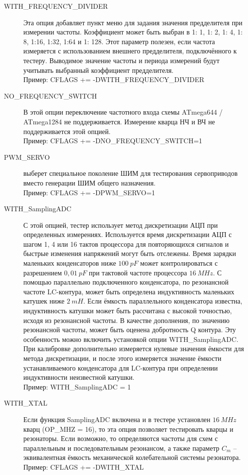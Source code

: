 \begin{description}
  \item[WITH\_FREQUENCY\_DIVIDER]
Эта опция добавляет пункт меню для задания значения предделителя при измерении частоты.
Коэффициент может быть выбран в 1: 1, 1: 2, 1: 4, 1: 8, 1:16, 1:32, 1:64 и 1: 128.
Этот параметр полезен, если частота измеряется с использованием внешнего предделителя, подключённого к тестеру.
Выводимое значение частоты и периода измерений будут учитывать выбранный коэффициент предделителя.\\
Пример: CFLAGS += -DWITH\_FREQUENCY\_DIVIDER

 \item[NO\_FREQUENCY\_SWITCH]
В этой опции переключение частотного входа схемы ATmega644 / ATmega1284 не поддерживается.
Измерение кварца НЧ и ВЧ не поддерживается этой опцией.\\
Пример: CFLAGS += -DNO\_FREQUENCY\_SWITCH=1

 \item[PWM\_SERVO] 
выберет специальное поколение ШИМ для тестирования сервоприводов вместо генерации ШИМ общего назначения.\\ 
Пример: CFLAGS += -DPWM\_SERVO=1

  \item[WITH\_SamplingADC] С этой опцией, тестер использует метод дискретизации АЦП при определенных измерениях.
Используется время дискретизации АЦП с шагом 1, 4 или 16 тактов процессора для повторяющихся сигналов и
быстрые изменения напряжений могут быть отслежены.
Время зарядки маленьких конденсаторов ниже \(100~pF\) может контролироваться с разрешением \(0,01~pF\) при 
тактовой частоте процессора \(16~MHz\).
С помощью параллельно подключенного конденсатора, по резонансной частоте LC-контура, может быть
определена индуктивность маленьких катушек ниже \(2~mH\).
Если ёмкость параллельного конденсатора известна, индуктивность катушки может быть рассчитана с высокой
точностью, исходя из резонансной частоты. В качестве дополнения, по значению резонансной частоты, может
быть оценена добротность Q контура.
Эту особенность можно включить установкой опции WITH\_SamplingADC.
При калибровке дополнительно измеряется нулевые значения ёмкости для метода дискретизации, и после этого измеряется
значение ёмкости устанавливаемого конденсатора для LC-контура при определении индуктивности неизвестной катушки.\\
Пример: WITH\_SamplingADC = 1

  \item[WITH\_XTAL] Если функция SamplingADC включена и в тестере установлен \(16~MHz\) кварц (OP\_MHZ = 16),
то эта опция позволяет тестировать кварцы и резонаторы.
Если возможно, то определяются частоты для схем с параллельным и последовательным резонансом,
а также параметр $C_{m}$ -- эквивалентная ёмкость механической колебательной системы резонатора.\\
Пример: CFLAGS += -DWITH\_XTAL


\end{description}
